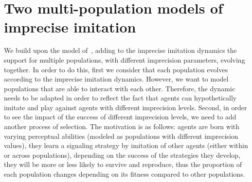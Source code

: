\documentclass[a4paper]{article}
\begin{document}


\section{Two multi-population models of imprecise imitation}
\label{sec:multi-population-model}
We build upon the model of~\textcite{franke_vagueness_2017}, adding to the imprecise imitation dynamics the support for multiple populations, with different imprecision parameters, evolving together.
In order to do this, first we consider that each population evolves according to the imprecise imitation dynamics.
However, we want to model populations that are able to interact with each other.
Therefore, the dynamic needs to be adapted in order to reflect the fact that agents can hypothetically imitate and play against agents with different imprecision levels.
Second, in order to see the impact of the success of different imprecision levels, we need to add another process of selection.
The motivation is as follows: agents are born with varying perceptual abilities (modeled as populations with different imprecision values), they learn a signaling strategy by imitation of other agents (either within or across populations), depending on the success of the strategies they develop, they will be more or less likely to survive and reproduce, thus the proportion of each population changes depending on its fitness compared to other populations.
\end{document}
